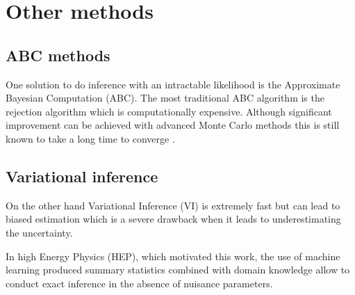 \section{Other methods} %
\label{sec:other_methods}








\subsection{ABC methods} %
\label{sub:abc_methods}



One solution to do inference with an intractable likelihood is the Approximate Bayesian Computation (ABC).
The most traditional ABC algorithm is the rejection algorithm which is computationally expensive.
Although significant improvement can be achieved with advanced Monte Carlo methods this is still known to take a long time to converge \needcite.






\subsection{Variational inference} %
\label{sub:variational_inference}


On the other hand Variational Inference (VI) is extremely fast but can lead to biased estimation which is a severe drawback when it leads to underestimating the uncertainty.

In high Energy Physics (HEP), which motivated this work, the use of machine learning produced summary statistics combined with domain knowledge allow to conduct exact inference in the absence of nuisance parameters.









